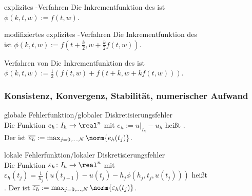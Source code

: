 \linie

\begin{Def}{explizites -Verfahren}
    Die Inkrementfunktion des
     ist\\
    $\phi(k, t, w) := f(t, w)$.
\end{Def}

\begin{Def}{modifiziertes explizites -Verfahren}
    Die Inkrementfunktion des\\
     ist
    $\phi(k, t, w) := f(t + \frac{k}{2}, w + \frac{k}{2} f(t, w))$.
\end{Def}

\begin{Def}{Verfahren von }
    Die Inkrementfunktion des  ist\\
    $\phi(k, t, w) := \frac{1}{2} (f(t, w) + f(t + k, w + k f(t, w)))$.
\end{Def}

\pagebreak

\subsubsection{%
    Konsistenz, Konvergenz, Stabilität, numerischer Aufwand%
}

\begin{Def}{globale Fehlerfunktion/globaler Diskretisierungsfehler}\\
    Die Funktion $e_h\colon I_h \rightarrow \real^n$ mit
    $e_h := u|_{I_h} - u_h$ heißt .\\
    Der  ist
    $\overline{e_h} := \max_{j=0,\dotsc,N} \norm{e_h(t_j)}$.
\end{Def}

\begin{Def}{lokale Fehlerfunktion/lokaler Diskretisierungsfehler}\\
    Die Funktion $\varepsilon_h\colon I_h \rightarrow \real^n$ mit
    $\varepsilon_h(t_j) = \frac{1}{h_j}
    (u(t_{j+1}) - u(t_j) - h_j \phi(h_j, t_j, u(t_j)))$ heißt\\
    .
    Der  ist
    $\overline{\varepsilon_h} :=
    \max_{j=0,\dotsc,N} \norm{\varepsilon_h(t_j)}$.
\end{Def}

